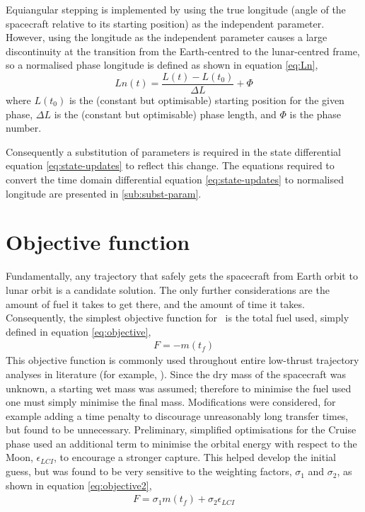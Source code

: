 Equiangular stepping is implemented by using the true longitude (angle of the spacecraft relative to its starting position) as the independent parameter. However, using the longitude as the independent parameter causes a large discontinuity at the transition from the Earth-centred to the lunar-centred frame, so a normalised phase longitude is defined as shown in equation \eqref{eq:Ln},
\begin{equation}
Ln(t) = \frac{L(t)-L(t_0)}{\Delta L}+\Phi \label{eq:Ln}
\end{equation}
where $L(t_0)$ is the (constant but optimisable) starting position for the given phase, $\Delta L$ is the (constant but optimisable) phase length, and $\Phi$ is the phase number. 

Consequently a substitution of parameters is required in the state differential equation \eqref{eq:state-updates} to reflect this change. The equations required to convert the time domain differential equation \eqref{eq:state-updates} to normalised longitude are presented in \autoref{sub:subst-param}.

\section{Objective function} \label{sec:Objective-function}

Fundamentally, any trajectory that safely gets the spacecraft from Earth orbit to lunar orbit is a candidate solution. The only further considerations are the amount of fuel it takes to get there, and the amount of time it takes. Consequently, the simplest objective function for \BW\ is the total fuel used, simply defined in equation \eqref{eq:objective},
\begin{gather}
F = -m(t_f) \label{eq:objective}
\end{gather}
 This objective function is commonly used throughout entire low-thrust trajectory analyses in literature (for example, \cite{Ichimura2008}). Since the dry mass of the spacecraft was unknown, a starting wet mass was assumed; therefore to minimise the fuel used one must simply minimise the final mass. Modifications were considered, for example adding a time penalty to discourage unreasonably long transfer times, but found to be unnecessary. Preliminary, simplified optimisations for the Cruise phase used an additional term to minimise the orbital energy with respect to the Moon, $\epsilon_{LCI}$, to encourage a stronger capture. This helped develop the initial guess, but was found to be very sensitive to the weighting factors, $\sigma_1$ and $\sigma_2$, as shown in equation \eqref{eq:objective2},
\begin{gather}
F = \sigma_1m(t_f)+\sigma_2\epsilon_{LCI} \label{eq:objective2}
\end{gather}
 
